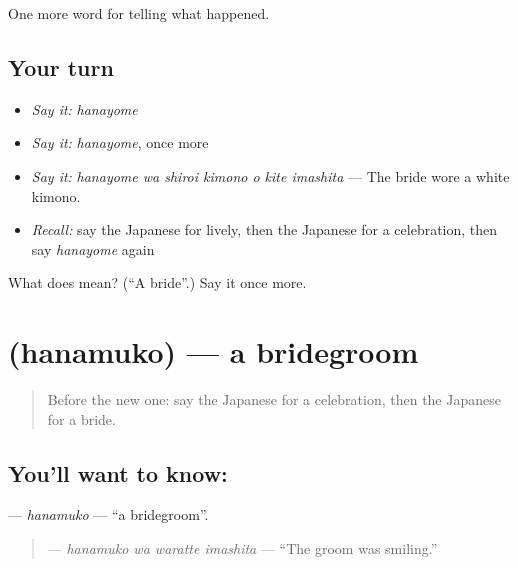\begin{grammarlens}[title={What you've built}]
One more word for telling what happened.
\end{grammarlens}

\subsection*{Your turn}
\begin{itemize}
\raggedright
  \item \emph{Say it:} \emph{hanayome}
  \item \emph{Say it:} \emph{hanayome}, once more
  \item \emph{Say it:} \emph{hanayome wa shiroi kimono o kite imashita} — The bride wore a white kimono.
  \item \emph{Recall:} say the Japanese for lively, then the Japanese for a celebration, then say \emph{hanayome} again
\end{itemize}

\begin{tcolorbox}[breakable,colback=teal!4,colframe=teal!35!black,title={Before you move on}]
What does  mean? (\textquotedblleft{}A bride\textquotedblright{}.) Say it once more.
\end{tcolorbox}
\section[\texorpdfstring{\ja{はなむこ} (hanamuko)}{はなむこ (hanamuko)}]{ (hanamuko) — a bridegroom}

\label{lesson:JA-C289-hanamuko}



\begin{quote}
Before the new one: say the Japanese for a celebration, then the Japanese for a bride.
\end{quote}

\subsection*{You'll want to know: }
\textbf{} — \emph{hanamuko} — \textquotedblleft{}a bridegroom\textquotedblright{}.

\begin{quote}
\textbf{ } — \emph{hanamuko wa waratte imashita} — \textquotedblleft{}The groom was smiling.\textquotedblright{}
\end{quote}

